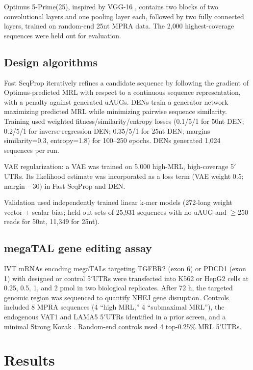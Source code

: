 \documentclass[11pt]{article}
\begin{document}
Optimus 5-Prime(25), inspired by VGG-16 \cite{simonyan2015very}, contains two blocks of two convolutional layers and one pooling layer each, followed by two fully connected layers, trained on random-end 25nt MPRA data. The 2{,}000 highest-coverage sequences were held out for evaluation.

\subsection{Design algorithms}
Fast SeqProp \cite{linder2020fastseqprop} iteratively refines a candidate sequence by following the gradient of Optimus-predicted MRL with respect to a continuous sequence representation, with a penalty against generated uAUGs. DENs \cite{linder2020generative} train a generator network maximizing predicted MRL while minimizing pairwise sequence similarity. Training used weighted fitness/similarity/entropy losses (0.1/5/1 for 50nt DEN; 0.2/5/1 for inverse-regression DEN; 0.35/5/1 for 25nt DEN; margins similarity=0.3, entropy=1.8) for 100--250 epochs. DENs generated 1{,}024 sequences per run.

VAE \cite{kingma2014autoencoding} regularization: a VAE was trained on 5{,}000 high-MRL, high-coverage 5$'$UTRs. Its likelihood estimate was incorporated as a loss term (VAE weight 0.5; margin $-$30) in Fast SeqProp and DEN.

Validation used independently trained linear k-mer models (272-long weight vector + scalar bias; held-out sets of 25{,}931 sequences with no uAUG and $\geq$250 reads for 50nt, 11{,}349 for 25nt).

\subsection{megaTAL gene editing assay}
IVT mRNAs encoding megaTALs targeting TGFBR2 (exon 6) \cite{yao2019targeting} or PDCD1 (exon 1) \cite{rupp2017car,shi2020crispr} with designed or control 5$'$UTRs were transfected into K562 or HepG2 cells at 0.25, 0.5, 1, and 2 pmol in two biological replicates. After 72 h, the targeted genomic region was sequenced to quantify NHEJ gene disruption. Controls included 8 MPRA sequences (4 ``high MRL,'' 4 ``submaximal MRL''), the endogenous VAT1 and LAMA5 5$'$UTRs identified in a prior screen, and a minimal Strong Kozak \cite{kozak1987analysis}. Random-end controls used 4 top-0.25\% MRL 5$'$UTRs.

\section{Results}
\end{document}
